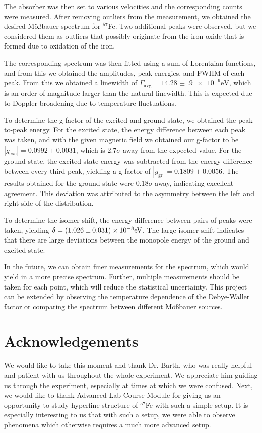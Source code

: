 \documentclass[a4paper]{report}
\numberwithin{equation}{section}
\begin{document}
 The absorber was then set to various velocities and the corresponding counts were measured. 
 After removing outliers from the measurement, we obtained the desired M\"o{\ss}bauer
 spectrum for $^{57}$Fe. Two additional peaks were observed, but we considered them as outliers 
 that possibly originate from the iron oxide that is formed due to oxidation of the iron. \par
 
 The corresponding spectrum was then fitted using a sum of Lorentzian 
 functions, and from this we obtained the amplitudes, peak energies, and FWHM of 
 each peak. From this we obtained a linewidth of $\Gamma_{\mathrm{avg}} = \num[{scientific-notation = true}]{14.28(90)e-9}\si{\electronvolt}$,
 which is an order of magnitude larger than the natural linewidth. This is expected due to 
 Doppler broadening due to temperature fluctuations. \par
 
To determine the g-factor of the excited and ground state, we obtained the peak-to-peak energy. 
For the excited state, the energy difference between each peak was taken, and with the given
magnetic field we obtained our g-factor to be $| g_\mathrm{exc} | = 0.0992 \pm 0.0031$, which is
$2.7\sigma$ away from the expected value. For the ground state, the excited state energy was 
subtracted from the energy difference between every third peak, yielding a g-factor of $| g_\mathrm{gr} | = 0.1809 \pm 0.0056$.
The results obtained for the ground state were $0.18\sigma$ away, indicating excellent agreement. This deviation
was attributed to the asymmetry between the left and right side of the distribution. \par 

To determine the isomer shift, the energy difference between pairs of peaks were taken, yielding 
$\delta = \num[scientific-notation=true]{0.1026(31)e-7}\si[]{\electronvolt}$. The large isomer shift
indicates that there are large deviations between the monopole energy of the ground and excited state. \par 

In the future, we can obtain finer measurements for the spectrum, which would yield 
in a more precise spectrum. Further, multiple measurements should be taken for each point, which 
will reduce the statistical uncertainty. This project can be extended by observing the temperature 
dependence of the Debye-Waller factor or comparing the spectrum between different M\"o{\ss}bauer sources.


\chapter{Acknowledgements}
We would like to take this moment and thank Dr. Barth, who was really helpful and patient with us throughout the whole experiment. We appreciate him guiding us through the experiment, especially at times at which we were confused. Next, we would like to thank Advanced Lab Course Module for giving us an opportunity to study hyperfine structure of $^{57}$Fe with such a simple setup. It is especially interesting to us that with such a setup, we were able to observe phenomena which otherwise requires a much more advanced setup. 
\end{document}

